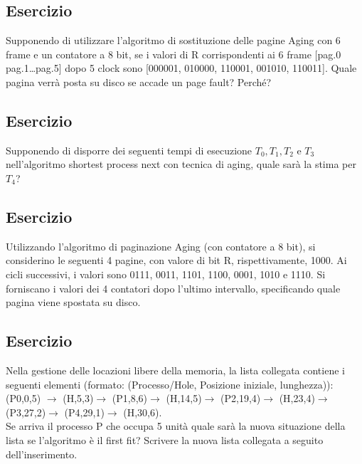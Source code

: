 \documentclass{article}
\begin{document}
\iffalse
\newpage




\subsection{Esercizio}
 Supponendo di utilizzare l’algoritmo di sostituzione delle
pagine Aging con 6 frame e un contatore a 8 bit, se i valori di R
corrispondenti ai 6 frame [pag.0 pag.1…pag.5] dopo 5 clock sono
[000001, 010000, 110001, 001010, 110011]. Quale pagina verrà posta su
disco se accade un page fault? Perché?
\vskip 0.5cm




\subsection{Esercizio}
Supponendo di disporre dei seguenti tempi di esecuzione $T_0, T_1, T_2$ e $T_3$ nell'algoritmo shortest process next con tecnica di aging, quale sarà la stima per $T_4$?	


\subsection{Esercizio}
Utilizzando l’algoritmo di paginazione Aging (con contatore a 8 bit), si
considerino le seguenti 4 pagine, con valore di bit R, rispettivamente, 1000. Ai
cicli successivi, i valori sono 0111, 0011, 1101, 1100, 0001, 1010 e 1110. Si
forniscano i valori dei 4 contatori dopo l’ultimo intervallo, specificando quale
pagina viene spostata su disco.
\vskip 0.5cm






\subsection{Esercizio}
Nella gestione delle locazioni libere della memoria, la
lista collegata contiene i seguenti elementi (formato: (Processo/Hole,
Posizione iniziale, lunghezza)):
(P0,0,5) $\to$ (H,5,3)$\to$ (P1,8,6)$\to$ (H,14,5)$\to$ (P2,19,4)$\to$ (H,23,4)$\to$ (P3,27,2)$\to$ (P4,29,1)$\to$ (H,30,6).\\
Se arriva il processo P che occupa 5 unità quale sarà la nuova
situazione della lista se l’algoritmo è il first fit? Scrivere la
nuova lista collegata a seguito dell’inserimento.
\vskip 0.5cm
\end{document}
